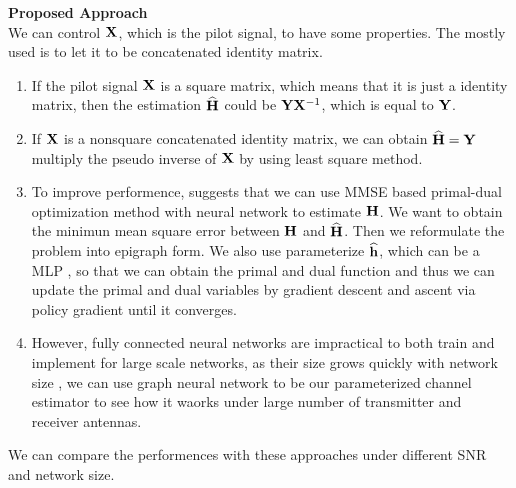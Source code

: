 \documentclass[a4paper, onecolumn, , 11pt]{IEEEtran}
\begin{document}
    \noindent \textbf{Proposed Approach}\\
        We can control ${\bf X}$, which is the pilot signal, to have some properties. The mostly used is to let it to be concatenated identity matrix.
        \begin{enumerate}
            \item If the pilot signal ${\bf X}$ is a square matrix, which means that it is just a identity matrix, then the estimation $\widehat{{\bf H}}$ could be 
                ${\bf Y}{\bf X}^{-1}$, which is equal to ${\bf Y}$.
            \item If ${\bf X}$ is a nonsquare concatenated identity matrix, we can obtain $\widehat{{\bf H}}= {\bf Y}$ multiply the pseudo inverse of ${\bf X}$ by using least square method.
            \item To improve performence, \cite{Carrson} suggests that we can use MMSE based primal-dual optimization method with neural network to estimate ${{\bf H}}$.
                We want to obtain the minimun mean square error between ${\bf H}$ and $\widehat{{\bf H}}$. Then we reformulate the problem into epigraph form. We also use 
                parameterize $\widehat{{\bf h}}$, which can be a MLP \cite{Eisen2019journal}, so that we can obtain the primal and dual function and thus we can 
                update the primal and dual variables by gradient descent and ascent via policy gradient \cite{Eisen2019journal} until it converges.
            \item However, fully connected neural networks are impractical to both train and implement for large scale networks, as their size grows quickly with 
                network size \cite{Eisen2019conf}, we can use graph neural network \cite{Eisen2020,Naderi2022,Naderi2023,Naderi2024} to be our parameterized 
                channel estimator to see how it waorks under large number of transmitter and receiver antennas.
        \end{enumerate}
        We can compare the performences with these approaches under different SNR and network size.

    \vspace{1cm}
\end{document}
